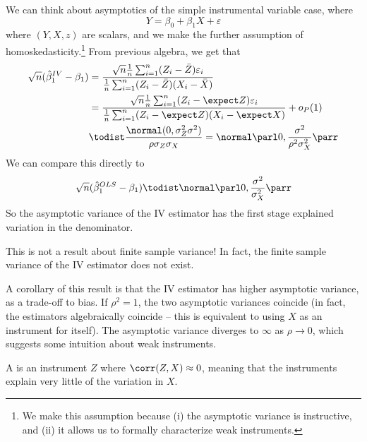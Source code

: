 \documentclass[10pt]{article}
\begin{document}
We can think about asymptotics of the simple instrumental variable case, where \[Y = \beta_0 + \beta_1 X + \varepsilon\]where $(Y,X,z)$ are scalars, and we make the further assumption of homoskedasticity.\footnote{We make this assumption because (i) the asymptotic variance is instructive, and (ii) it allows us to formally characterize weak instruments.} From previous algebra, we get that
\begin{align*}
	\sqrt{n}(\hat{\beta}_1^{IV} - \beta_1) &= \frac{\sqrt{n}\frac{1}{n}\sum_{i=1}^n (Z_i - \bar{Z})\varepsilon_i}{\frac{1}{n} \sum_{i=1}^n (Z_i - \bar{Z})(X_i - \bar{X})} \\ 
	&= \frac{\sqrt{n}\frac{1}{n}\sum_{i=1}^n (Z_i - \expect Z)\varepsilon_i}{\frac{1}{n} \sum_{i=1}^n (Z_i - \expect Z)(X_i - \expect X)} + o_P(1) \\
	&\todist \frac{\normal(0,\sigma_Z^2\sigma^2)}{\rho \sigma_Z \sigma_X} = \normal \parl 0,\frac{\sigma^2}{\rho^2 \sigma_X^2}\parr
\end{align*}
We can compare this directly to \[\sqrt{n}(\hat{\beta}^{OLS}_1 - \beta_1) \todist \normal \parl 0,\frac{\sigma^2}{\sigma_X^2}\parr\]So the asymptotic variance of the IV estimator has the first stage explained variation in the denominator. 

\begin{remark}
	This is not a result about finite sample variance! In fact, the finite sample variance of the IV estimator does not exist.
\end{remark}
A corollary of this result is that the IV estimator has higher asymptotic variance, as a trade-off to bias. If $\rho^2 = 1$, the two asymptotic variances coincide (in fact, the estimators algebraically coincide -- this is equivalent to using $X$ as an instrument for itself). The asymptotic variance diverges to $\infty$ as $\rho \to 0$, which suggests some intuition about weak instruments.

\begin{definition}
	A  is an instrument $Z$ where $\corr(Z,X) \approx 0$, meaning that the instruments explain very little of the variation in $X$. 
\end{definition}
\end{document}
